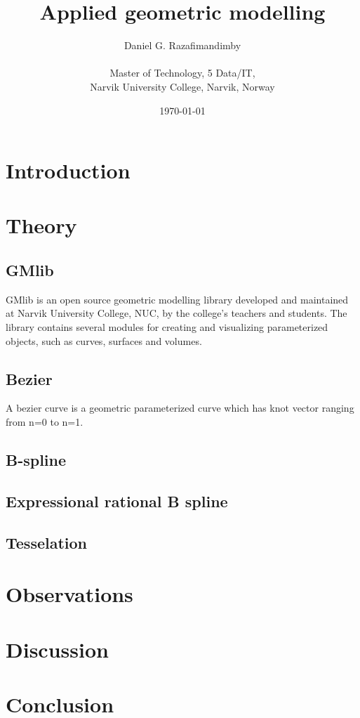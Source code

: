 \documentclass[a4paper,11pt]{article}
\title{Applied geometric modelling}
\author{
  Daniel G. Razafimandimby \\ \\
  Master of Technology, 5 Data/IT, \\
  Narvik University College, Narvik, Norway
}
\date{\today}
\begin{document}
\maketitle

\begin{abstract}

\end{abstract}


\section{Introduction}

\section{Theory}
\subsection{GMlib}
GMlib is an open source geometric modelling library developed and maintained at Narvik University College, NUC, 
by the college's teachers and students. The library contains several modules for creating and visualizing parameterized 
objects, such as curves, surfaces and volumes. 
\subsection{Bezier}
A bezier curve is a geometric parameterized curve which has knot vector ranging from n=0 to n=1.
\subsection{B-spline}
\subsection{Expressional rational B spline}
\subsection{Tesselation}

\section{Observations}

\section{Discussion}

\section{Conclusion}

%
%
\end{document}
